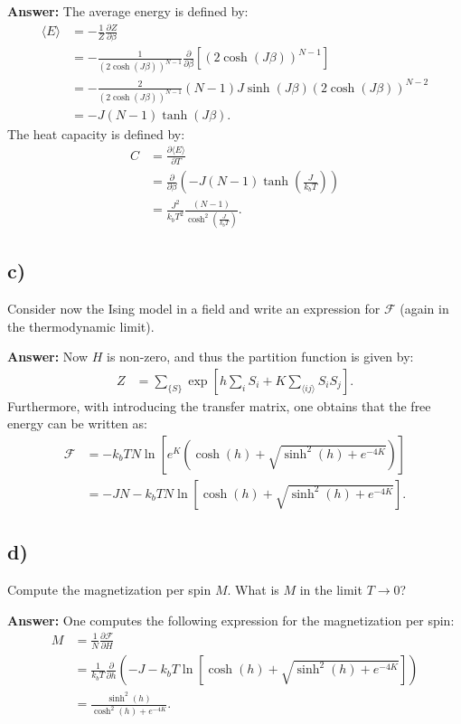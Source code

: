 \documentclass[a4paper]{article}
\newcommand{\newparagraph}{\vspace{.5cm}\noindent}
\newcommand{\fpartial}[2]{\frac{\partial #1}{\partial #2}}
\newcommand{\average}[1]{\langle #1 \rangle}
\begin{document}
\newparagraph
\textbf{Answer:} The average energy is defined by:
\begin{align*}
    \average{E} &= -\frac{1}{Z}\fpartial{Z}{\beta}\\
    &=-\frac{1}{\left(2\cosh(J\beta)\right)^{N-1}}\frac{\partial}{\partial \beta}\left[\left(2\cosh(J\beta)\right)^{N-1}\right]\\
    &= -\frac{2}{\left(2\cosh(J\beta)\right)^{N-1}}\left(N-1\right)J\sinh(J\beta)\left(2\cosh(J\beta)\right)^{N-2}\\
    &= -J\left(N-1\right)\tanh(J\beta).
\end{align*}The heat capacity is defined by:
\begin{align*}
    C &= \fpartial{\average{E}}{T}\\
    &= \fpartial{}{\beta}\left(-J\left(N-1\right)\tanh\left(\frac{J}{k_bT}\right)\right)\\
    &= \frac{J^2}{k_bT^2}\frac{(N-1)}{\cosh^2\left(\frac{J}{k_bT}\right)}.
\end{align*}

\subsection*{c)}
Consider now the Ising model in a field and write an expression for $\mathcal{F}$ (again in the thermodynamic limit).

\newparagraph
\textbf{Answer:} Now $H$ is non-zero, and thus the partition function is given by:
\begin{align*}
    Z &= \sum_{\{S\}}\exp\left[h\sum_i S_i + K\sum_{\average{ij}}S_iS_j\right].
\end{align*}Furthermore, with introducing the transfer matrix, one obtains that the free energy can be written as:
\begin{align*}
    \mathcal{F} &= -k_bTN\ln\left[e^{K}\left(\cosh(h) + \sqrt{\sinh^2(h) + e^{-4K}}\right)\right]\\
    &= -JN - k_bTN\ln\left[\cosh(h) + \sqrt{\sinh^2(h) + e^{-4K}}\right].
\end{align*}

\subsection*{d)}
Compute the magnetization per spin $M$. What is $M$ in the limit $T\to0$?

\newparagraph
\textbf{Answer:} One computes the following expression for the magnetization per spin:
\begin{align*}
    M &= \frac{1}{N}\fpartial{\mathcal{F}}{H}\\
    &= \frac{1}{k_bT}\fpartial{}{h}\left(- J - k_bT\ln\left[\cosh(h) + \sqrt{\sinh^2(h) + e^{-4K}}\right]\right)\\
    &= \frac{\sinh^2(h)}{\cosh^2(h) + e^{-4K}}.
\end{align*}
\end{document}
